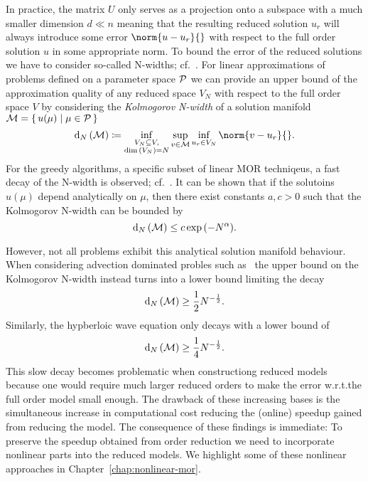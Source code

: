 In practice, the matrix $U$ only serves as a projection onto a subspace with a much smaller dimension $d \ll n$ meaning that the resulting reduced solution $u_r$ will always introduce some error $\norm{u - u_r}{}$ with respect to the full order solution $u$ in some appropriate norm.
To bound the error of the reduced solutions we have to consider so-called N-widths; cf.~\cite{Pinkus1985}.
For linear approximations of problems defined on a parameter space $\mathcal{P}$ we can provide an upper bound of the approximation quality of any reduced space $V_N$ with respect to the full order space $V$ by considering the \emph{Kolmogorov N-width} of a solution manifold $\mathcal{M} = \left\{\,u(\mu)\mid\mu \in \mathcal{P}\,\right\}$
\begin{equation}
    \kolm{\mcl{M}} \coloneqq \inf\limits_{\substack{V_N \subseteq V,\\\dim{(V_N)} = N}} \sup\limits_{v \in \mcl{M}} \inf\limits_{u_r \in V_N} \norm{v - u_r}{}.
\end{equation}
For the greedy algorithms, a specific subset of linear MOR techniqeus, a fast decay of the N-width is observed; cf.~\cite{Binev2011, DeVore2013}.
It can be shown that if the solutoins $u(\mu)$ depend analytically on $\mu$, then there exist constants $a, c > 0$ such that the Kolmogorov N-width can be bounded by
\begin{equation*}
    \mathop{}\!\mathrm{d}_N\left(\mathcal{M}\right) \leq c \exp{(-N^\alpha)}.
\end{equation*}

However, not all problems exhibit this analytical solution manifold behaviour.
When considering advection dominated probles such as~\cite[Section~5.1]{Ohlberger2016} the upper bound on the Kolmogorov N-width instead turns into a lower bound limiting the decay
\begin{equation*}
    \mathop{}\!\mathrm{d}_N\left(\mathcal{M}\right) \geq \frac{1}{2} N^{- \frac{1}{2}}.
\end{equation*}
Similarly, the hypberloic wave equation only decays with a lower bound of
\begin{equation*}
    \mathop{}\!\mathrm{d}_N\left(\mathcal{M}\right) \geq \frac{1}{4} N^{- \frac{1}{2}}.
\end{equation*}
This slow decay becomes problematic when constructiong reduced models because one would require much larger reduced orders to make the error w.r.t.\@ the full order model small enough.
The drawback of these increasing bases is the simultaneous increase in computational cost reducing the (online) speedup gained from reducing the model.
The consequence of these findings is immediate: To preserve the speedup obtained from order reduction we need to incorporate nonlinear parts into the reduced models.
We highlight some of these nonlinear approaches in Chapter~\ref{chap:nonlinear-mor}.
